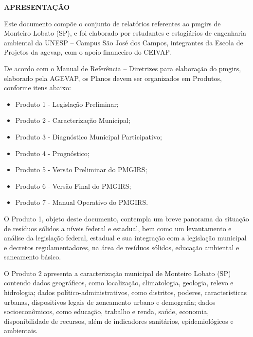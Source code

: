 \begin{center}
    {\bfseries\Large\MakeUppercase{Apresentação}}
    \vspace{1.5em}
\end{center}
Este documento compõe o conjunto de relatórios referentes ao \gls{pmgirs} de Monteiro Lobato (SP), e foi elaborado por estudantes e estagiários de engenharia ambiental da UNESP – Campus São José dos Campos, integrantes da Escola de Projetos da \gls{agevap}, com o apoio financeiro do CEIVAP.\vspace{1.5em}

De acordo com o Manual de Referência – Diretrizes para elaboração do \gls{pmgirs}, elaborado pela AGEVAP, os Planos devem ser organizados em Produtos, conforme itens abaixo:

\begin{itemize}
    \item {Produto 1 - Legislação Preliminar;}
    \item {Produto 2 - Caracterização Municipal;}
    \item {Produto 3 - Diagnóstico Municipal Participativo;}
    \item Produto 4 - Prognóstico;
    \item Produto 5 - Versão Preliminar do PMGIRS;
    \item Produto 6 - Versão Final do PMGIRS;
    \item Produto 7 - Manual Operativo do PMGIRS.
\end{itemize}



O Produto 1, objeto deste documento, contempla um breve panorama da situação de resíduos sólidos a níveis federal e estadual, bem como um levantamento e análise da legislação federal, estadual e sua integração com a legislação municipal e decretos regulamentadores, na área de resíduos sólidos, educação ambiental e saneamento básico.\vspace{1.5em}

O Produto 2 apresenta a caracterização municipal de Monteiro Lobato (SP) contendo dados geográficos, como localização, climatologia, geologia, relevo e hidrologia; dados político-administrativos, como distritos, poderes, características urbanas, dispositivos legais de zoneamento urbano e demografia; dados socioeconômicos, como educação, trabalho e renda, saúde, economia, disponibilidade de recursos, além de indicadores sanitários, epidemiológicos e ambientais.\vspace{1.5em}

